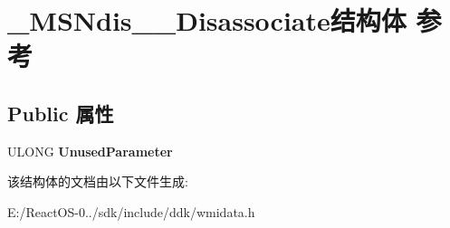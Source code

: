 \hypertarget{struct___m_s_ndis__80211___disassociate}{}\section{\+\_\+\+M\+S\+Ndis\+\_\+\_\+\+Disassociate结构体 参考}
\label{struct___m_s_ndis__80211___disassociate}
\subsection*{Public 属性}
\begin{DoxyCompactItemize}
\item 
\mbox{\label{struct___m_s_ndis__80211___disassociate_a806359a6b4dee8d793744714246efd71}} 
U\+L\+O\+NG {\bfseries Unused\+Parameter}
\end{DoxyCompactItemize}


该结构体的文档由以下文件生成\+:\begin{DoxyCompactItemize}
\item 
E\+:/\+React\+O\+S-\/0../sdk/include/ddk/wmidata.\+h\end{DoxyCompactItemize}
